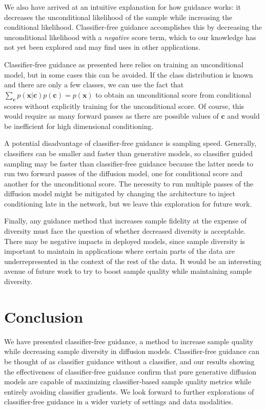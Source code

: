 \documentclass{article} %
\newcommand{\bc}{\mathbf{c}}
\newcommand{\bx}{\mathbf{x}}
\begin{document}
We also have arrived at an intuitive explanation for how guidance works: it decreases the unconditional likelihood of the sample while increasing the conditional likelihood. %
Classifier-free guidance accomplishes this by decreasing the unconditional likelihood with a \emph{negative} score term, which to our knowledge has not yet been explored and may find uses in other applications.






Classifier-free guidance as presented here relies on training an unconditional model, but in some cases this can be avoided. If the class distribution is known and there are only a few classes, we can use the fact that $\sum_\bc p(\bx|\bc) p(\bc) = p(\bx)$ to obtain an unconditional score from conditional scores without explicitly training for the unconditional score. Of course, this would require as many forward passes as there are possible values of $\bc$ and would be inefficient for high dimensional conditioning.


A potential disadvantage of classifier-free guidance is sampling speed. Generally, classifiers can be smaller and faster than generative models, so classifier guided sampling may be faster than classifier-free guidance because the latter needs to run two forward passes of the diffusion model, one for conditional score and another for the unconditional score. The necessity to run multiple passes of the diffusion model might be mitigated by changing the architecture to inject conditioning late in the network, but we leave this exploration for future work.

Finally, any guidance method that increases sample fidelity at the expense of diversity must face the question of whether decreased diversity is acceptable. There may be negative impacts in deployed models, since sample diversity is important to maintain in applications where certain parts of the data are underrepresented in the context of the rest of the data. It would be an interesting avenue of future work to try to boost sample quality while maintaining sample diversity.



\section{Conclusion}

We have presented classifier-free guidance, a method to increase sample quality while decreasing sample diversity in diffusion models. Classifier-free guidance can be thought of as classifier guidance without a classifier, and our results showing the effectiveness of classifier-free guidance confirm that pure generative diffusion models are capable of maximizing classifier-based sample quality metrics while entirely avoiding classifier gradients. We look forward to further explorations of classifier-free guidance in a wider variety of settings and data modalities.
\end{document}
